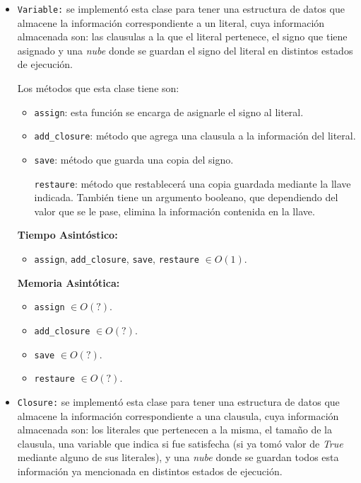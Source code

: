 \documentclass[letterpaper,12pt]{article}
\begin{document}
\begin{itemize}
	\item \texttt{Variable:} se implementó esta clase para tener una estructura de datos que almacene la información correspondiente a un literal, cuya información almacenada son: las clausulas a la que el literal pertenece, el signo que tiene asignado y una \textit{nube} donde se guardan el signo del literal en distintos estados de ejecución.
	
	Los métodos que esta clase tiene son:
	\begin{itemize}
		\item \texttt{assign}: esta función  se encarga de asignarle el signo al literal.
		
		\item \texttt{add\_closure}: método que agrega una clausula a la información del literal.
	    
	    \item \texttt{save}: método que guarda una copia del signo.
	    
	    \texttt{restaure}: método que restablecerá una copia guardada mediante la llave indicada. También tiene un argumento booleano, que dependiendo del valor que se le pase, elimina la información contenida en  la llave.
	\end{itemize}
	
	\textbf{Tiempo Asintóstico:}
    \begin{itemize}
    	\item \texttt{assign}, \texttt{add\_closure}, \texttt{save}, \texttt{restaure} $\in O(1)$.
    \end{itemize} 
    
    \textbf{Memoria Asintótica:}
    \begin{itemize}
    	\item \texttt{assign} $\in O(?)$.
    	\item \texttt{add\_closure} $\in O(?)$.
    	\item \texttt{save} $\in O(?)$.
    	\item \texttt{restaure} $\in O(?)$.
    \end{itemize}

	\item \texttt{Closure:} se implementó esta clase para tener una estructura de datos que almacene la información correspondiente a una clausula, cuya información almacenada son: los literales que pertenecen a la misma, el tamaño de la clausula, una variable que indica si fue satisfecha (si ya tomó valor de \textit{True} mediante alguno de sus literales), y una \textit{nube} donde se guardan todos esta información ya mencionada en distintos estados de ejecución.
	


\end{itemize}
\end{document}
